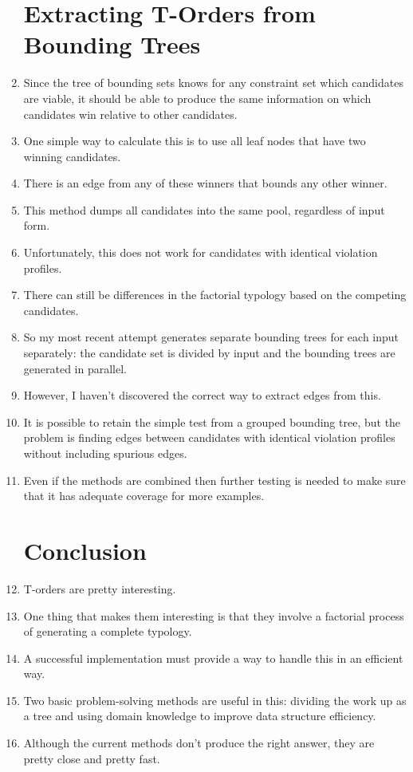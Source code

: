 \documentclass[11pt]{article}
\begin{document}
\begin{enumerate}
  \section{Extracting T-Orders from Bounding Trees}
\item Since the tree of bounding sets knows for any constraint set which
  candidates are viable, it should be able to produce the same information on
  which candidates win relative to other candidates.
\item One simple way to calculate this is to use all leaf nodes that
  have two winning candidates.
\item There is an edge from any of these winners that bounds any other winner.
\item This method dumps all candidates into the same pool, regardless of
  input form.
\item Unfortunately, this does not work for candidates with identical violation
  profiles.
\item There can still be differences in the factorial typology based on the
  competing candidates.
\item So my most recent attempt generates separate bounding trees for each
  input separately: the candidate set is divided by input and the bounding trees
  are generated in parallel.
\item However, I haven't discovered the correct way to extract edges from this.
\item It is possible to retain the simple test from a grouped bounding tree, but
  the problem is finding edges between candidates with identical violation profiles
  without including spurious edges.
\item Even if the methods are combined then further testing is needed to make
  sure that it has adequate coverage for more examples.
  \section{Conclusion}
\item T-orders are pretty interesting.
\item One thing that makes them interesting is that they involve a factorial process
  of generating a complete typology.
\item A successful implementation must provide a way to handle this in an
  efficient way.
\item Two basic problem-solving methods are useful in this: dividing the work
  up as a tree and using domain knowledge to improve data structure efficiency.
\item Although the current methods don't produce the right answer, they are
  pretty close and pretty fast.
\end{enumerate}
\end{document}
